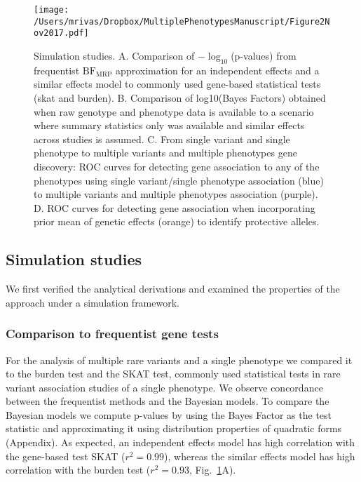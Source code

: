 \documentclass{nature}
\begin{document}
\newpage 
\begin{figure}
\centering
   \texttt{[image: /Users/mrivas/Dropbox/MultiplePhenotypesManuscript/Figure2Nov2017.pdf]}
  \caption{Simulation studies. A. Comparison of $-\log_{10}$(p-values) from frequentist $\textrm{BF}_{\textrm{MRP}}$ approximation for an independent effects and a similar effects model to commonly used gene-based statistical tests (skat and burden). B. Comparison of log10(Bayes Factors) obtained when raw genotype and phenotype data is available to a scenario where summary statistics only was available and similar effects across studies is assumed. C. From single variant and single phenotype to multiple variants and multiple phenotypes gene discovery: ROC curves for detecting gene association to any of the phenotypes using single variant/single phenotype association (blue) to multiple variants and multiple phenotypes association (purple). D. ROC curves for detecting gene association when incorporating prior mean of genetic effects (orange) to identify protective alleles. }
  \label{Fig2}
\end{figure}

\subsection{Simulation studies}
We first verified the analytical derivations and examined the properties of the approach under a simulation framework. 

\subsubsection{Comparison to frequentist gene tests}
For the analysis of multiple rare variants and a single phenotype we compared it to the burden test and the SKAT test, commonly used statistical tests in rare variant association studies of a single phenotype. We observe concordance between the frequentist methods and the Bayesian models. To compare the Bayesian models we compute p-values by using the Bayes Factor as the test statistic and approximating it using distribution properties of quadratic forms (Appendix). As expected, an independent effects model has high correlation with the gene-based test SKAT ($r^2 = 0.99$), whereas the similar effects model has high correlation with the burden test ($r^2 = 0.93$, Fig.~\ref{Fig2}A). 
\end{document}
